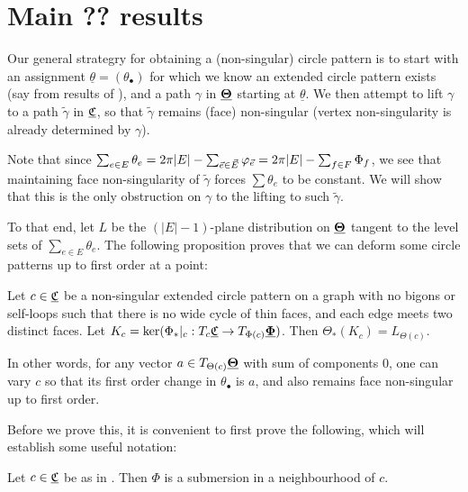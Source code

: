\section{Main ?? results}




Our general strategry for obtaining a (non-singular) circle pattern
is to start with an assignment $\underline{\theta} = (\theta_\bullet)$
for which we know an extended circle pattern exists
(say from results of \cite{BandS}),
and a path $\gamma$ in ${\underline{\mathbf{\Theta}}}$ starting at $\underline{\theta}$.
We then attempt to lift $\gamma$ to a path $\tilde{\gamma}$ in ${\underline{\mathfrak{C}}}$,
so that $\tilde{\gamma}$ remains (face) non-singular
(vertex non-singularity is already determined by $\gamma$).

Note that since $\sum_{e\in E} \theta_e
= 2\pi |E| - \sum_{\vec{e} \in \vec{E}} \varphi_{\vec{e}}
= 2\pi |E| - \sum_{f\in F} \Phi_f$,
we see that maintaining face non-singularity of $\tilde{\gamma}$
forces $\sum \theta_e$ to be constant.
We will show that this is the only obstruction on $\gamma$
to the lifting to such $\tilde{\gamma}$.

To that end, let $L$ be the $(|E|-1)$-plane distribution on ${\underline{\mathbf{\Theta}}}$
tangent to the level sets of $\sum_{e\in E} \theta_e$.
The following proposition proves that we can deform
some circle patterns up to first order at a point:


\begin{proposition}
\label{p:point_lift}
Let $c \in {\underline{\mathfrak{C}}}$ be a
non-singular extended circle pattern on a graph
with no bigons or self-loops such that
there is no wide cycle of thin faces,
and each edge meets two distinct faces.
Let $K_c = \ker (\Phi_*|_c : T_c {\underline{\mathfrak{C}}} \to T_{\Phi(c)} {\underline{\mathbf{\Phi}}})$.
Then $\Theta_*(K_c) = L_{\Theta(c)}$.

In other words, for any vector $a \in T_{\Theta(c)} {\underline{\mathbf{\Theta}}}$
with sum of components 0, one can vary $c$ so that its
first order change in $\theta_\bullet$ is $a$,
and also remains face non-singular up to first order.
\end{proposition}


Before we prove this, it is convenient to first prove the following,
which will establish some useful notation:

\begin{lemma}
\label{l:Phi_full}
Let $c \in {\underline{\mathfrak{C}}}$ be as in .
Then $\Phi$ is a submersion in a neighbourhood of $c$.
\end{lemma}

